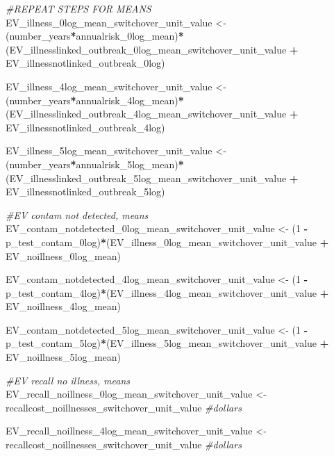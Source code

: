 \documentclass[
]{article}
\newenvironment{Shaded}{\begin{snugshade}}{\end{snugshade}}
\newcommand{\CommentTok}[1]{\textcolor[rgb]{0.56,0.35,0.01}{\textit{#1}}}
\newcommand{\DecValTok}[1]{\textcolor[rgb]{0.00,0.00,0.81}{#1}}
\newcommand{\NormalTok}[1]{#1}
\newcommand{\OtherTok}[1]{\textcolor[rgb]{0.56,0.35,0.01}{#1}}
\newcommand{\SpecialCharTok}[1]{\textcolor[rgb]{0.81,0.36,0.00}{\textbf{#1}}}
\begin{document}
\begin{Shaded}
\begin{Highlighting}[]
\CommentTok{\#REPEAT STEPS FOR MEANS}
\NormalTok{EV\_illness\_0log\_mean\_switchover\_unit\_value }\OtherTok{\textless{}{-}}\NormalTok{ (number\_years}\SpecialCharTok{*}\NormalTok{annualrisk\_0log\_mean)}\SpecialCharTok{*}\NormalTok{(EV\_illnesslinked\_outbreak\_0log\_mean\_switchover\_unit\_value }\SpecialCharTok{+}\NormalTok{ EV\_illnessnotlinked\_outbreak\_0log)}

\NormalTok{EV\_illness\_4log\_mean\_switchover\_unit\_value }\OtherTok{\textless{}{-}}\NormalTok{ (number\_years}\SpecialCharTok{*}\NormalTok{annualrisk\_4log\_mean)}\SpecialCharTok{*}\NormalTok{(EV\_illnesslinked\_outbreak\_4log\_mean\_switchover\_unit\_value }\SpecialCharTok{+}\NormalTok{ EV\_illnessnotlinked\_outbreak\_4log)}

\NormalTok{EV\_illness\_5log\_mean\_switchover\_unit\_value }\OtherTok{\textless{}{-}}\NormalTok{ (number\_years}\SpecialCharTok{*}\NormalTok{annualrisk\_5log\_mean)}\SpecialCharTok{*}\NormalTok{(EV\_illnesslinked\_outbreak\_5log\_mean\_switchover\_unit\_value }\SpecialCharTok{+}\NormalTok{ EV\_illnessnotlinked\_outbreak\_5log)}


\CommentTok{\#EV contam not detected, means}
\NormalTok{EV\_contam\_notdetected\_0log\_mean\_switchover\_unit\_value }\OtherTok{\textless{}{-}}\NormalTok{ (}\DecValTok{1} \SpecialCharTok{{-}}\NormalTok{ p\_test\_contam\_0log)}\SpecialCharTok{*}\NormalTok{(EV\_illness\_0log\_mean\_switchover\_unit\_value }\SpecialCharTok{+}\NormalTok{ EV\_noillness\_0log\_mean)}

\NormalTok{EV\_contam\_notdetected\_4log\_mean\_switchover\_unit\_value }\OtherTok{\textless{}{-}}\NormalTok{ (}\DecValTok{1} \SpecialCharTok{{-}}\NormalTok{ p\_test\_contam\_4log)}\SpecialCharTok{*}\NormalTok{(EV\_illness\_4log\_mean\_switchover\_unit\_value }\SpecialCharTok{+}\NormalTok{ EV\_noillness\_4log\_mean)}

\NormalTok{EV\_contam\_notdetected\_5log\_mean\_switchover\_unit\_value }\OtherTok{\textless{}{-}}\NormalTok{ (}\DecValTok{1} \SpecialCharTok{{-}}\NormalTok{ p\_test\_contam\_5log)}\SpecialCharTok{*}\NormalTok{(EV\_illness\_5log\_mean\_switchover\_unit\_value }\SpecialCharTok{+}\NormalTok{ EV\_noillness\_5log\_mean)}


\CommentTok{\#EV recall no illness, means}
\NormalTok{EV\_recall\_noillness\_0log\_mean\_switchover\_unit\_value }\OtherTok{\textless{}{-}}\NormalTok{ recallcost\_noillnesses\_switchover\_unit\_value }\CommentTok{\#dollars}

\NormalTok{EV\_recall\_noillness\_4log\_mean\_switchover\_unit\_value }\OtherTok{\textless{}{-}}\NormalTok{ recallcost\_noillnesses\_switchover\_unit\_value }\CommentTok{\#dollars}


\end{Highlighting}
\end{Shaded}
\end{document}
